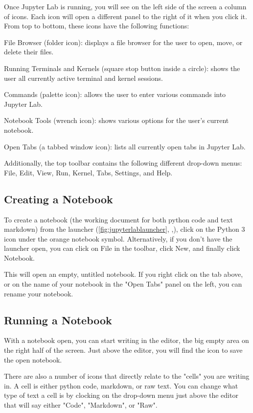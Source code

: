 \documentclass[pdftex,12pt]{artikel3}
\newcommand{\tabfigref}[1]{\autoref{#1}, \nameref{#1},}
\begin{document}
Once Jupyter Lab is running, you will see on the left side of the screen a column of icons. Each icon will open a different panel to the right of it when you click it. From top to bottom, these icons have the following functions:

File Browser (folder icon): displays a file browser for the user to open, move, or delete their files.

Running Terminals and Kernels (square stop button inside a circle): shows the user all currently active terminal and kernel sessions.

Commands (palette icon): allows the user to enter various commands into Jupyter Lab.

Notebook Tools (wrench icon): shows various options for the user's current notebook.

Open Tabs (a tabbed window icon): lists all currently open tabs in Jupyter Lab.

Additionally, the top toolbar contains the following different drop-down menus: File, Edit, View, Run, Kernel, Tabs, Settings, and Help.

\subsection{Creating a Notebook}

To create a notebook (the working document for both python code and text markdown) from the launcher (\tabfigref{fig:jupyterlablauncher}), click on the Python 3 icon under the orange notebook symbol. Alternatively, if you don't have the launcher open, you can click on File in the toolbar, click New, and finally click Notebook.

This will open an empty, untitled notebook. If you right click on the tab above, or on the name of your notebook in the "Open Tabs" panel on the left, you can rename your notebook.

\subsection{Running a Notebook}

With a notebook open, you can start writing in the editor, the big empty area on the right half of the screen. Just above the editor, you will find the icon to save the open notebook.

There are also a number of icons that directly relate to the "cells" you are writing in. A cell is either python code, markdown, or raw text. You can change what type of text a cell is by clocking on the drop-down menu just above the editor that will say either "Code", "Markdown", or "Raw".
\end{document}
